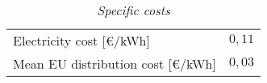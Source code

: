 \begin{table}[H]
\centering
\begin{tabular}{cc}
\hline
\rowcolor{bluepoli!40}\multicolumn{2}{|c|}{\cellcolor{bluepoli!40}\textbf{Specific Costs}} \\ \hline
\multicolumn{1}{|l|}{Electricity cost {[}€/kWh{]}}          & \multicolumn{1}{c|}{$0,11$}  \\ \hline
\multicolumn{1}{|l|}{Mean EU distribution cost {[}€/kWh{]}} & 
\multicolumn{1}{c|}{$0,03$} \\ \hline
\end{tabular}
\caption{\textit{Specific costs}}
\label{tab:crodoeco}
\end{table}
